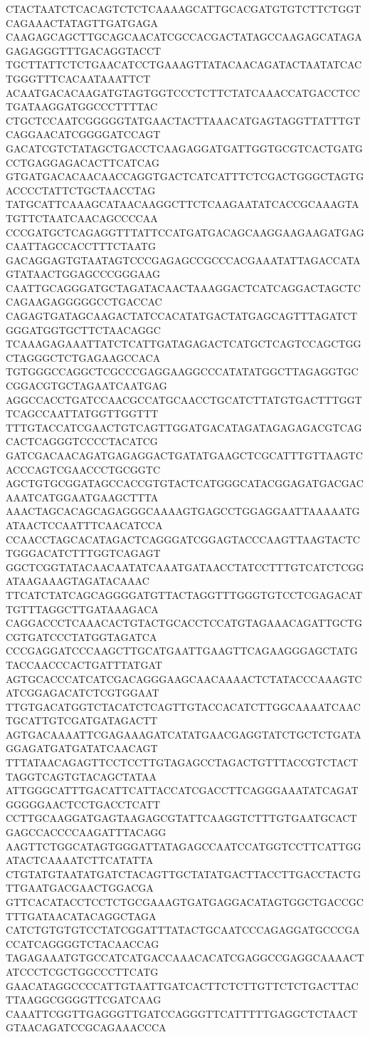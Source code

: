 CTACTAATCTCACAGTCTCTCAAAAGCATTGCACGATGTGTCTTCTGGTCAGAAACTATAGTTGATGAGA
CAAGAGCAGCTTGCAGCAACATCGCCACGACTATAGCCAAGAGCATAGAGAGAGGGTTTGACAGGTACCT
TGCTTATTCTCTGAACATCCTGAAAGTTATACAACAGATACTAATATCACTGGGTTTCACAATAAATTCT
ACAATGACACAAGATGTAGTGGTCCCTCTTCTATCAAACCATGACCTCCTGATAAGGATGGCCCTTTTAC
CTGCTCCAATCGGGGGTATGAACTACTTAAACATGAGTAGGTTATTTGTCAGGAACATCGGGGATCCAGT
GACATCGTCTATAGCTGACCTCAAGAGGATGATTGGTGCGTCACTGATGCCTGAGGAGACACTTCATCAG
GTGATGACACAACAACCAGGTGACTCATCATTTCTCGACTGGGCTAGTGACCCCTATTCTGCTAACCTAG
TATGCATTCAAAGCATAACAAGGCTTCTCAAGAATATCACCGCAAAGTATGTTCTAATCAACAGCCCCAA
CCCGATGCTCAGAGGTTTATTCCATGATGACAGCAAGGAAGAAGATGAGCAATTAGCCACCTTTCTAATG
GACAGGAGTGTAATAGTCCCGAGAGCCGCCCACGAAATATTAGACCATAGTATAACTGGAGCCCGGGAAG
CAATTGCAGGGATGCTAGATACAACTAAAGGACTCATCAGGACTAGCTCCAGAAGAGGGGGCCTGACCAC
CAGAGTGATAGCAAGACTATCCACATATGACTATGAGCAGTTTAGATCTGGGATGGTGCTTCTAACAGGC
TCAAAGAGAAATTATCTCATTGATAGAGACTCATGCTCAGTCCAGCTGGCTAGGGCTCTGAGAAGCCACA
TGTGGGCCAGGCTCGCCCGAGGAAGGCCCATATATGGCTTAGAGGTGCCGGACGTGCTAGAATCAATGAG
AGGCCACCTGATCCAACGCCATGCAACCTGCATCTTATGTGACTTTGGTTCAGCCAATTATGGTTGGTTT
TTTGTACCATCGAACTGTCAGTTGGATGACATAGATAGAGAGACGTCAGCACTCAGGGTCCCCTACATCG
GATCGACAACAGATGAGAGGACTGATATGAAGCTCGCATTTGTTAAGTCACCCAGTCGAACCCTGCGGTC
AGCTGTGCGGATAGCCACCGTGTACTCATGGGCATACGGAGATGACGACAAATCATGGAATGAAGCTTTA
AAACTAGCACAGCAGAGGGCAAAAGTGAGCCTGGAGGAATTAAAAATGATAACTCCAATTTCAACATCCA
CCAACCTAGCACATAGACTCAGGGATCGGAGTACCCAAGTTAAGTACTCTGGGACATCTTTGGTCAGAGT
GGCTCGGTATACAACAATATCAAATGATAACCTATCCTTTGTCATCTCGGATAAGAAAGTAGATACAAAC
TTCATCTATCAGCAGGGGATGTTACTAGGTTTGGGTGTCCTCGAGACATTGTTTAGGCTTGATAAAGACA
CAGGACCCTCAAACACTGTACTGCACCTCCATGTAGAAACAGATTGCTGCGTGATCCCTATGGTAGATCA
CCCGAGGATCCCAAGCTTGCATGAATTGAAGTTCAGAAGGGAGCTATGTACCAACCCACTGATTTATGAT
AGTGCACCCATCATCGACAGGGAAGCAACAAAACTCTATACCCAAAGTCATCGGAGACATCTCGTGGAAT
TTGTGACATGGTCTACATCTCAGTTGTACCACATCTTGGCAAAATCAACTGCATTGTCGATGATAGACTT
AGTGACAAAATTCGAGAAAGATCATATGAACGAGGTATCTGCTCTGATAGGAGATGATGATATCAACAGT
TTTATAACAGAGTTCCTCCTTGTAGAGCCTAGACTGTTTACCGTCTACTTAGGTCAGTGTACAGCTATAA
ATTGGGCATTTGACATTCATTACCATCGACCTTCAGGGAAATATCAGATGGGGGAACTCCTGACCTCATT
CCTTGCAAGGATGAGTAAGAGCGTATTCAAGGTCTTTGTGAATGCACTGAGCCACCCCAAGATTTACAGG
AAGTTCTGGCATAGTGGGATTATAGAGCCAATCCATGGTCCTTCATTGGATACTCAAAATCTTCATATTA
CTGTATGTAATATGATCTACAGTTGCTATATGACTTACCTTGACCTACTGTTGAATGACGAACTGGACGA
GTTCACATACCTCCTCTGCGAAAGTGATGAGGACATAGTGGCTGACCGCTTTGATAACATACAGGCTAGA
CATCTGTGTGTCCTATCGGATTTATACTGCAATCCCAGAGGATGCCCGACCATCAGGGGTCTACAACCAG
TAGAGAAATGTGCCATCATGACCAAACACATCGAGGCCGAGGCAAAACTATCCCTCGCTGGCCCTTCATG
GAACATAGGCCCCATTGTAATTGATCACTTCTCTTGTTCTCTGACTTACTTAAGGCGGGGTTCGATCAAG
CAAATTCGGTTGAGGGTTGATCCAGGGTTCATTTTTGAGGCTCTAACTGTAACAGATCCGCAGAAACCCA
